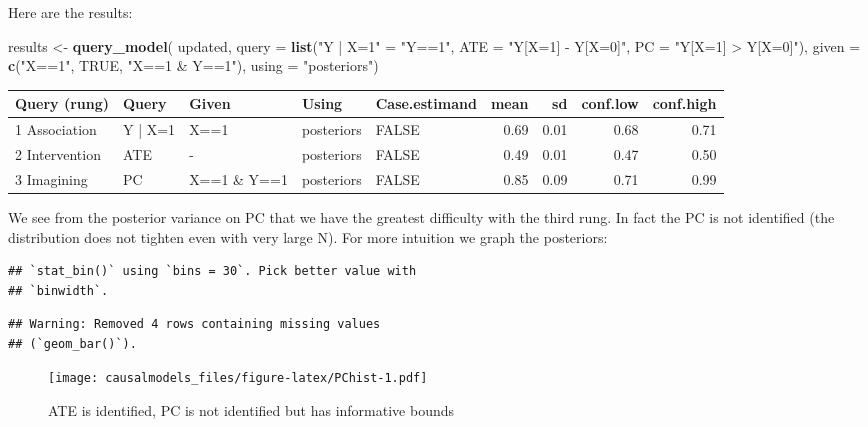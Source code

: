 \documentclass[
  12pt,
]{book}
\newenvironment{Shaded}{\begin{snugshade}}{\end{snugshade}}
\newcommand{\AttributeTok}[1]{\textcolor[rgb]{0.13,0.29,0.53}{#1}}
\newcommand{\ConstantTok}[1]{\textcolor[rgb]{0.56,0.35,0.01}{#1}}
\newcommand{\FunctionTok}[1]{\textcolor[rgb]{0.13,0.29,0.53}{\textbf{#1}}}
\newcommand{\NormalTok}[1]{#1}
\newcommand{\OtherTok}[1]{\textcolor[rgb]{0.56,0.35,0.01}{#1}}
\newcommand{\StringTok}[1]{\textcolor[rgb]{0.31,0.60,0.02}{#1}}
\begin{document}
Here are the results:

\begin{Shaded}
\begin{Highlighting}[]
\NormalTok{results }\OtherTok{\textless{}{-}} \FunctionTok{query\_model}\NormalTok{(}
\NormalTok{ updated,}
 \AttributeTok{query =} \FunctionTok{list}\NormalTok{(}\StringTok{"Y | X=1"} \OtherTok{=} \StringTok{"Y==1"}\NormalTok{, }
              \AttributeTok{ATE =} \StringTok{"Y[X=1] {-} Y[X=0]"}\NormalTok{, }
              \AttributeTok{PC  =} \StringTok{"Y[X=1] \textgreater{} Y[X=0]"}\NormalTok{),}
 \AttributeTok{given =} \FunctionTok{c}\NormalTok{(}\StringTok{"X==1"}\NormalTok{, }\ConstantTok{TRUE}\NormalTok{, }\StringTok{"X==1 \& Y==1"}\NormalTok{),}
 \AttributeTok{using =} \StringTok{"posteriors"}\NormalTok{)}
\end{Highlighting}
\end{Shaded}

\begin{tabular}{l|l|l|l|l|r|r|r|r}
\hline
Query (rung) & Query & Given & Using & Case.estimand & mean & sd & conf.low & conf.high\\
\hline
1 Association & Y | X=1 & X==1 & posteriors & FALSE & 0.69 & 0.01 & 0.68 & 0.71\\
\hline
2 Intervention & ATE & - & posteriors & FALSE & 0.49 & 0.01 & 0.47 & 0.50\\
\hline
3 Imagining & PC & X==1 \& Y==1 & posteriors & FALSE & 0.85 & 0.09 & 0.71 & 0.99\\
\hline
\end{tabular}

We see from the posterior variance on PC that we have the greatest difficulty with the third rung. In fact the PC is not identified (the distribution does not tighten even with very large N). For more intuition we graph the posteriors:

\begin{verbatim}
## `stat_bin()` using `bins = 30`. Pick better value with
## `binwidth`.
\end{verbatim}

\begin{verbatim}
## Warning: Removed 4 rows containing missing values
## (`geom_bar()`).
\end{verbatim}

\begin{figure}
\centering
\texttt{[image: causalmodels\_files/figure-latex/PChist-1.pdf]}
\caption{\label{fig:PChist}ATE is identified, PC is not identified but has informative bounds}
\end{figure}
\end{document}

